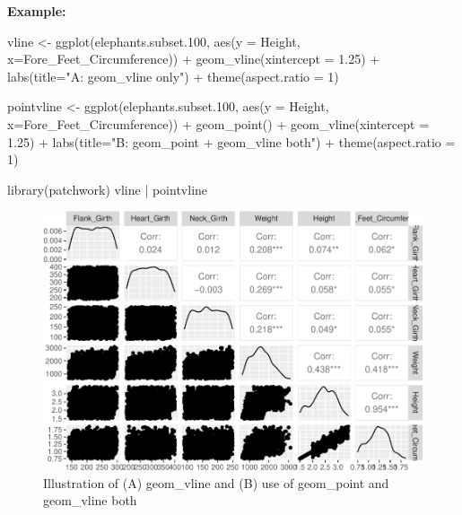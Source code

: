 \documentclass[
]{book}
\newenvironment{Shaded}{\begin{snugshade}}{\end{snugshade}}
\newcommand{\AttributeTok}[1]{\textcolor[rgb]{0.77,0.63,0.00}{#1}}
\newcommand{\DecValTok}[1]{\textcolor[rgb]{0.00,0.00,0.81}{#1}}
\newcommand{\FloatTok}[1]{\textcolor[rgb]{0.00,0.00,0.81}{#1}}
\newcommand{\FunctionTok}[1]{\textcolor[rgb]{0.00,0.00,0.00}{#1}}
\newcommand{\NormalTok}[1]{#1}
\newcommand{\OtherTok}[1]{\textcolor[rgb]{0.56,0.35,0.01}{#1}}
\newcommand{\SpecialCharTok}[1]{\textcolor[rgb]{0.00,0.00,0.00}{#1}}
\newcommand{\StringTok}[1]{\textcolor[rgb]{0.31,0.60,0.02}{#1}}
\begin{document}
\textbf{Example:}

\begin{Shaded}
\begin{Highlighting}[]
\NormalTok{vline }\OtherTok{\textless{}{-}} \FunctionTok{ggplot}\NormalTok{(elephants.subset}\FloatTok{.100}\NormalTok{, }\FunctionTok{aes}\NormalTok{(}\AttributeTok{y =}\NormalTok{ Height, }\AttributeTok{x=}\NormalTok{Fore\_Feet\_Circumference)) }\SpecialCharTok{+} \FunctionTok{geom\_vline}\NormalTok{(}\AttributeTok{xintercept =} \FloatTok{1.25}\NormalTok{) }\SpecialCharTok{+} 
  \FunctionTok{labs}\NormalTok{(}\AttributeTok{title=}\StringTok{"A: \textasciigrave{}geom\_vline\textasciigrave{} only"}\NormalTok{) }\SpecialCharTok{+}
  \FunctionTok{theme}\NormalTok{(}\AttributeTok{aspect.ratio =} \DecValTok{1}\NormalTok{)}

\NormalTok{pointvline }\OtherTok{\textless{}{-}} \FunctionTok{ggplot}\NormalTok{(elephants.subset}\FloatTok{.100}\NormalTok{, }\FunctionTok{aes}\NormalTok{(}\AttributeTok{y =}\NormalTok{ Height, }\AttributeTok{x=}\NormalTok{Fore\_Feet\_Circumference)) }\SpecialCharTok{+} 
  \FunctionTok{geom\_point}\NormalTok{() }\SpecialCharTok{+} 
  \FunctionTok{geom\_vline}\NormalTok{(}\AttributeTok{xintercept =} \FloatTok{1.25}\NormalTok{) }\SpecialCharTok{+} 
  \FunctionTok{labs}\NormalTok{(}\AttributeTok{title=}\StringTok{"B: \textasciigrave{}geom\_point + geom\_vline\textasciigrave{} both"}\NormalTok{) }\SpecialCharTok{+}
  \FunctionTok{theme}\NormalTok{(}\AttributeTok{aspect.ratio =} \DecValTok{1}\NormalTok{)}

\FunctionTok{library}\NormalTok{(patchwork)}
\NormalTok{vline }\SpecialCharTok{|}\NormalTok{ pointvline}
\end{Highlighting}
\end{Shaded}

\begin{figure}
\centering
\includegraphics{Data-Visualisation-geom-Encyclopedia_files/figure-latex/unnamed-chunk-55-1.pdf}
\caption{\label{fig:unnamed-chunk-55}Illustration of (A) geom\_vline and (B) use of geom\_point and geom\_vline both}
\end{figure}
\end{document}
